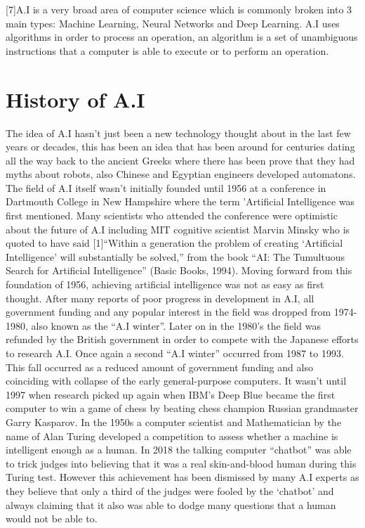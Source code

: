 \documentclass[letterpaper, 10 pt, conference]{ieeeconf}  %
\begin{document}
[7]A.I is a very broad area of computer science which is commonly broken into 3 main types: Machine Learning, Neural Networks and Deep Learning. A.I uses algorithms in order to process an operation, an algorithm is a set of unambiguous instructions that a computer is able to execute or to perform an operation.

\section{History of A.I}
The idea of A.I hasn't just been a new technology thought about in the last few years or decades, this has been an idea that has been around for centuries dating all the way back to the ancient Greeks where there has been prove that they had myths about robots, also Chinese and Egyptian engineers developed automatons. The field of A.I itself wasn't initially founded until 1956 at a conference in Dartmouth College in New Hampshire where the term 'Artificial Intelligence was first mentioned. Many scientists who attended the conference were optimistic about the future of A.I including MIT cognitive scientist Marvin Minsky who is quoted to have said [1]“Within a generation the problem of creating ‘Artificial Intelligence’ will substantially be solved,” from the book “AI: The Tumultuous Search for Artificial Intelligence” (Basic Books, 1994). Moving forward from this foundation of 1956, achieving artificial intelligence was not as easy as first thought. After many reports of poor progress in development in A.I, all government funding and any popular interest in the field was dropped from 1974-1980, also known as the “A.I winter”. Later on in the 1980’s the field was refunded by the British government in order to compete with the Japanese efforts to research A.I. Once again a second “A.I winter” occurred from 1987 to 1993. This fall occurred as a reduced amount of government funding and also coinciding with collapse of the early general-purpose computers. 
It wasn’t until 1997 when research picked up again when IBM’s Deep Blue became the first computer to win a game of chess by beating chess champion Russian grandmaster Garry Kasparov. In the 1950s a computer scientist and Mathematician by the name of Alan Turing developed a competition to assess whether a machine is intelligent enough as a human. In 2018 the talking computer “chatbot” was able to trick judges into believing that it was a real skin-and-blood human during this Turing test. However this achievement has been dismissed by many A.I experts as they believe that only a third of the judges were fooled by the ‘chatbot’ and always claiming that it also was able to dodge many questions that a human would not be able to. 
\end{document}
